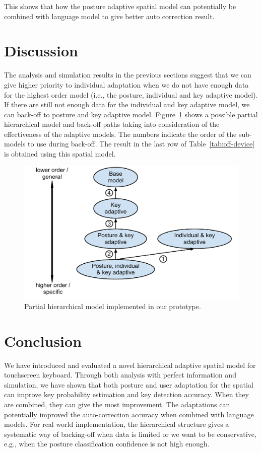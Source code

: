 \documentclass{sigchi}
\begin{document}
This shows that how the posture adaptive spatial model can potentially be combined 
with language model to give better auto correction result.

\section{Discussion}
The analysis and simulation results in the previous sections suggest that we
can give higher priority to individual adaptation when we do not have enough data for
the highest order model (i.e., the posture, individual and key adaptive model). 
If there are still not enough data for the individual and key adaptive model, we 
can back-off to posture and key adaptive model. Figure~\ref{fig:partial-hierarchy} 
shows a possible partial hierarchical model and back-off paths taking into consideration
of the effectiveness of the adaptive models. The numbers indicate the order of the 
sub-models to use during back-off. The result in the
last row of Table~\ref{tab:off-device} is obtained using this spatial model.

\begin{figure}
  \centering
  \includegraphics[width=0.9\columnwidth]{figures/partial-hierarchy.pdf}
  \caption{Partial hierarchical model implemented in our prototype.}
  \label{fig:partial-hierarchy}
\end{figure}

\section{Conclusion}
We have introduced and evaluated a novel hierarchical adaptive spatial model for
touchscreen keyboard. Through both analysis with perfect information and simulation,
we have shown that both posture and user adaptation for the spatial can improve
key probability estimation and key detection accuracy. When they are combined, they can
give the most improvement. The adaptations can potentially
improved the auto-correction accuracy when combined with language models. For real world
implementation, the
hierarchical structure gives a systematic way of backing-off  when data is limited
or we want to be conservative, e.g., when the posture classification confidence is not 
high enough. 
\end{document}
